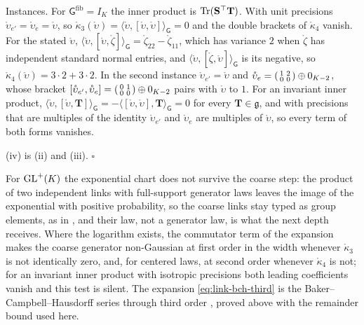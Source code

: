 Instances. For \(\mathsf G^{\mathrm{fib}}=I_K\) the inner product is \(\operatorname{Tr}(\mathbf S^\top\mathbf T)\). With unit
precisions \(\mathring\upsilon_{e'}=\mathring\upsilon_e=\mathring\upsilon\), so
\(\mathring\kappa_3(\mathring\upsilon)=\langle\mathring\upsilon,[\mathring\upsilon,\mathring\upsilon]\rangle_{\mathsf G}=0\)
and the double brackets of \(\mathring\kappa_4\) vanish. For the stated \(\mathring\upsilon\),
\(\langle\mathring\upsilon,[\mathring\upsilon,\mathring\zeta]\rangle_{\mathsf G}=\mathring\zeta_{22}-\mathring\zeta_{11}\),
which has variance \(2\) when \(\mathring\zeta\) has independent standard normal entries, and
\(\langle\mathring\upsilon,[\mathring\zeta,\mathring\upsilon]\rangle_{\mathsf G}\) is its negative, so
\(\mathring\kappa_4(\mathring\upsilon)=3\cdot2+3\cdot2\). In the second instance \(\mathring\upsilon_{e'}=\mathring\upsilon\)
and \(\mathring\upsilon_e=\begin{psmallmatrix}1&2\\0&0\end{psmallmatrix}\oplus0_{K-2}\), whose bracket
\([\mathring\upsilon_{e'},\mathring\upsilon_e]=\begin{psmallmatrix}0&1\\0&0\end{psmallmatrix}\oplus0_{K-2}\) pairs with
\(\mathring\upsilon\) to \(1\). For an invariant inner product,
\(\langle\mathring\upsilon,[\mathring\upsilon,\mathbf T]\rangle_{\mathsf G}=-\langle[\mathring\upsilon,\mathring\upsilon],\mathbf T\rangle_{\mathsf G}=0\)
for every \(\mathbf T\in\mathfrak g\), and with precisions that are multiples of the identity
\(\mathring\upsilon_{e'}\) and \(\mathring\upsilon_e\) are multiples of \(\mathring\upsilon\), so every term of both
forms vanishes.

(iv) is (ii) and (iii). $\square$

For \(\mathrm{GL}^+(K)\) the exponential chart does not survive the coarse step: the product of two independent
links with full-support generator laws leaves the image of the exponential with positive probability, so
the coarse links stay typed as group elements, as in , and their law, not
a generator law, is what the next depth receives. Where the logarithm exists, the commutator term of the
expansion makes the coarse generator non-Gaussian at first order in the width whenever
\(\mathring\kappa_3\) is not identically zero, and, for centered laws, at second order whenever
\(\mathring\kappa_4\) is not; for an invariant inner product with isotropic precisions both leading
coefficients vanish and this test is silent. The expansion \eqref{eq:link-bch-third} is the
Baker--Campbell--Hausdorff series through third order \citep[Ch.~5]{Hall2015}, proved above with the
remainder bound used here.

